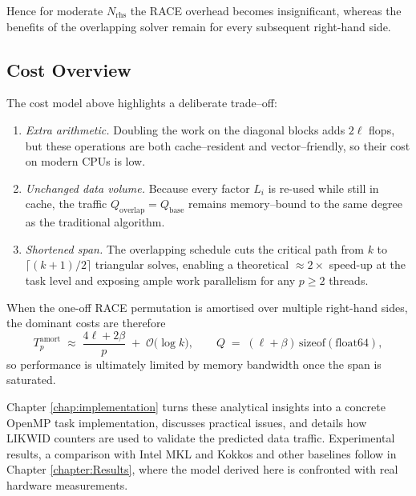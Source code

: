 Hence for moderate $N_{\text{rhs}}$ the RACE
overhead becomes insignificant, whereas the benefits of the overlapping
solver remain for every subsequent right-hand side.

\subsection{Cost Overview}
\label{sec:meth_cost_summary}
The cost model above highlights a deliberate trade–off:

\begin{enumerate}
  \item\emph{Extra arithmetic.}  
        Doubling the work on the diagonal blocks adds
        $2\ell$ flops, but these operations are
        both cache–resident and vector–friendly, so their cost
        on modern CPUs is low.

  \item\emph{Unchanged data volume.}  
        Because every factor $L_i$ is re-used while still in cache,
        the traffic
        $Q_{\mathrm{overlap}} = Q_{\mathrm{base}}$
        remains memory–bound to the same degree as the
        traditional algorithm.

  \item\emph{Shortened span.}  
        The overlapping schedule cuts the critical path from
        $k$ to $\lceil(k+1)/2\rceil$ triangular solves,
        enabling a theoretical $\approx 2\times$ speed-up
        at the task level and exposing ample work
        parallelism for any $p\ge 2$ threads.
\end{enumerate}

When the one-off RACE permutation is amortised
over multiple right-hand sides, the dominant costs are therefore
$$
  T_p^{\text{amort}}
  \;\approx\;
  \frac{4\ell + 2\beta}{p} \;+\; \mathcal O\!\bigl(\log k\bigr),
  \qquad
  Q \;=\; (\ell+\beta)\,\mathrm{sizeof}(\text{float64}),
$$
so performance is ultimately limited by
memory bandwidth once the span is saturated.

Chapter \ref{chap:implementation} turns these analytical insights
into a concrete OpenMP task implementation, discusses practical
issues, and details how LIKWID counters are used to validate the predicted data
traffic.  
Experimental results, a comparison with Intel MKL and Kokkos and other
baselines follow in Chapter \ref{chapter:Results}, where the model
derived here is confronted with real hardware measurements.

